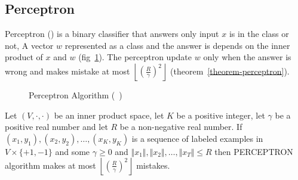 \subsection{Perceptron}
Perceptron (\cite{rosenblatt58a}) is a binary classifier that answers only input $x$ is in the class or not,
A vector $w$ represented as a class and the answer is depends on the inner product of $x$ and $w$ (fig~\ref{fig:alg-perceptron}).
The perceptron update $w$ only when the answer is wrong 
and makes mistake at most $\left\lfloor \left( \frac{R}{\gamma} \right)^2\right\rfloor$ (theorem~\ref{theorem-perceptron}).
\begin{figure}[hbt!]
  \begin{algorithm}[H]
    \SetAlgoLined
    \DontPrintSemicolon
    \end{algorithm}
    \caption{Perceptron Algorithm (~\cite{rosenblatt58a})}
  \label{fig:alg-perceptron}
\end{figure}

\begin{theorem}
  \label{theorem-perceptron}
  Let $(V,\cdot,\cdot)$ be an inner product space, let $K$ be a
  positive integer, let $\gamma$ be a positive real number and let $R$ be a non-negative real number. If $(x_1,y_1),(x_2,y_2),\dots,(x_K,y_K)$
  is a sequence of labeled examples in $V\times\{+1,-1\}$ and some $\gamma\geq 0$ and
  $\Vert x_1\Vert ,\Vert x_2\Vert ,\dots,\Vert x_T \Vert\leq R$ then PERCEPTRON algorithm makes at most $\left\lfloor \left( \frac{R}{\gamma} \right)^2\right\rfloor$ mistakes.
\end{theorem}

